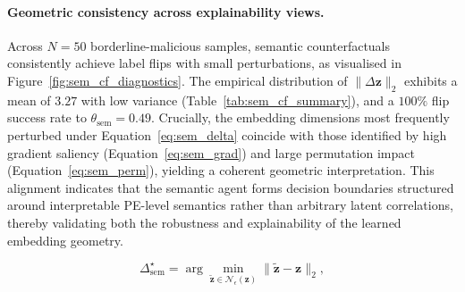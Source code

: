 \documentclass[lettersize,journal]{IEEEtran}
\begin{document}
\paragraph{Geometric consistency across explainability views.}
Across $N=50$ borderline-malicious samples, semantic counterfactuals consistently achieve label flips with small perturbations, as visualised in
Figure~\ref{fig:sem_cf_diagnostics}. The empirical distribution of $\lVert \Delta \mathbf{z} \rVert_2$ exhibits a mean of $3.27$ with low variance (Table~\ref{tab:sem_cf_summary}), and a $100\%$ flip success rate to
$\theta_{\mathrm{sem}}=0.49$. Crucially, the embedding dimensions most frequently perturbed under Equation~\eqref{eq:sem_delta} coincide with those identified by high gradient saliency (Equation~\eqref{eq:sem_grad}) and large permutation impact (Equation~\eqref{eq:sem_perm}), yielding a coherent geometric interpretation. This alignment indicates that the semantic agent forms decision boundaries structured around interpretable PE-level semantics rather than arbitrary latent correlations, thereby validating both the robustness and explainability of the learned embedding geometry.



\begin{equation}
\Delta^{\star}_{\mathrm{sem}}
=
\arg\min_{\tilde{\mathbf{z}} \in \mathcal{N}_{\epsilon}(\mathbf{z})}
\|\tilde{\mathbf{z}} - \mathbf{z}\|_2 ,
\label{eq:sem_cf_min}
\end{equation}

\begin{table}[t]
\centering
{}
\caption{Representative semantic counterfactual shifts generated via the minimal-deformation objective in Equation~\eqref{eq:sem_cf_min}. Latent directions with the largest impact correspond to PE structural irregularities and entropy-driven embedding dimensions.}
\label{tab:sem_cf}
\end{table}
\end{document}
